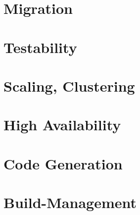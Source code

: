 \section{Migration}
\label{sec:Migration}


\section{Testability}
\label{sec:Testability}


\section{Scaling, Clustering}
\label{sec:Scaling, Clustering}


\section{High Availability}
\label{sec:High Availability}


\section{Code Generation}
\label{sec:Code Generation}


\section{Build-Management}
\label{sec:Build-Management}
